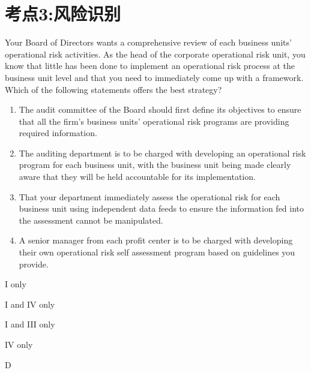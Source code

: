 \documentclass{article}
\newcounter{question} %
\begin{document}
\section{考点3:风险识别}
\setcounter{question}{0}
\begin{question}
    Your Board of Directors wants a comprehensive review of each business units' operational risk activities. As the head of the corporate operational risk unit, you know that little has been done to implement an operational risk process at the business unit level and that you need to immediately come up with a framework. Which of the following statements offers the best strategy?
    \begin{enumerate}
        \item The audit committee of the Board should first define its objectives to ensure that all the firm's business units' operational risk programs are providing required information.
        \item The auditing department is to be charged with developing an operational risk program for each business unit, with the business unit being made clearly aware that they will be held accountable for its implementation.
        \item That your department immediately assess the operational risk for each business unit using independent data feeds to ensure the information fed into the assessment cannot be manipulated.
        \item A senior manager from each profit center is to be charged with developing their own operational risk self assessment program based on guidelines you provide.
    \end{enumerate}
\end{question}

\begin{choices}
    \item I only
    \item I and IV only
    \item I and III only
    \item IV only
\end{choices}

\begin{correctanswer}
    D
\end{correctanswer}
\end{document}
